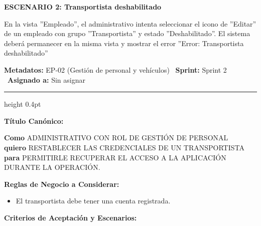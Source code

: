 \documentclass[a4paper,9pt]{article}
\begin{document}
\begin{tcolorbox}[hucard, title={\textbf{HU-10: ASIGNAR VEHÍCULO A TRANSPORTISTA} \hfill \scriptsize \colorbox{bluestatus}{\textbf{\ New\ }} \quad \colorbox{white}{\textcolor{primarydark}{\textbf{\ 2 pts\ }}}}]
{\noindent\textbf{\textcolor{secondarydark}{ESCENARIO 2:  Transportista deshabilitado}}\par\vspace{1pt}
En la vista ''Empleado'', el administrativo intenta seleccionar el icono de ''Editar'' de un empleado con grupo ''Transportista'' y estado ''Deshabilitado''. El sistema deberá permanecer en la misma vista y mostrar el error ''Error: Transportista deshabilitado''\par\vspace{2.5pt}
}\par
\end{tcolorbox}

\begin{tcolorbox}[hucard, title={\textbf{HU-11: RESTABLECER CREDENCIALES DEL TRANSPORTISTA} \hfill \scriptsize \colorbox{bluestatus}{\textbf{\ New\ }} \quad \colorbox{white}{\textcolor{primarydark}{\textbf{\ 3 pts\ }}}}]
\vspace{-1pt}
\noindent\textbf{\footnotesize Metadatos:} EP-02 (Gestión de personal y vehículos) \textbar\ \textbf{Sprint:} Sprint 2 \textbar\ \textbf{Asignado a:} Sin asignar\par\vspace{2pt}
\hrule height 0.4pt\par\vspace{3pt}
\noindent\textbf{\footnotesize Título Canónico:}\par\vspace{1pt}
{\small \textbf{Como} ADMINISTRATIVO CON ROL DE GESTIÓN DE PERSONAL \\ \textbf{quiero} RESTABLECER LAS CREDENCIALES DE UN TRANSPORTISTA \\ \textbf{para} PERMITIRLE RECUPERAR EL ACCESO A LA APLICACIÓN DURANTE LA OPERACIÓN.}\par\vspace{3pt}
\noindent\textbf{\footnotesize Reglas de Negocio a Considerar:}\par\vspace{1pt}
{\footnotesize
\begin{itemize}[leftmargin=12pt, nosep, itemsep=1.5pt, topsep=1pt]
\item El transportista debe tener una cuenta registrada.
\end{itemize}
}\par\vspace{3pt}
\noindent\textbf{\footnotesize Criterios de Aceptación y Escenarios:}\par\vspace{2pt}

\end{tcolorbox}
\end{document}
